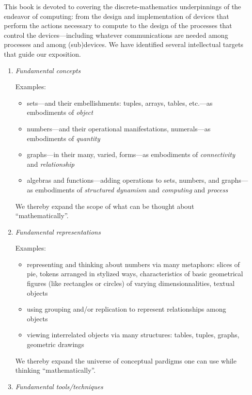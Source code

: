 This book is devoted to covering the discrete-mathematics
underpinnings of the endeavor of computing: from the design and
implementation of devices that perform the actions necessary to
compute to the design of the processes that control the
devices---including whatever communications are needed among processes
and among (sub)devices.  We have identified several intellectual
targets that guide our exposition.
\begin{enumerate}
\item
{\it Fundamental concepts}

\medskip

{\small\sf Examples:}
\begin{itemize}
\item%
sets---and their embellishments: tuples, arrays, tables, etc.---as
embodiments of {\it object}
\item
numbers---and their operational manifestations, numerals---as
embodiments of {\it quantity}
\item
graphs---in their many, varied, forms---as embodiments of {\it
  connectivity} and {\it relationship}
\item
algebras and functions---adding operations to sets, numbers, and
graphs---as embodiments of {\it structured dynamism} and {\it
  computing} and {\it process}
\end{itemize}
We thereby expand the scope of what can be thought about
``mathematically''.

\medskip

\item
{\it Fundamental representations}

\medskip

{\small\sf Examples:}
\begin{itemize}
\item
representing and thinking about numbers via many metaphors: slices of
pie, tokens arranged in stylized ways, characteristics of basic geometrical figures (like rectangles or circles)
of varying dimensionnalities, textual objects
\item
using grouping and/or replication to represent relationships among
objects
\item
viewing interrelated objects via many structures: tables, tuples,
graphs, geometric drawings
\end{itemize}
We thereby expand the universe of conceptual pardigms one can use
while thinking ``mathematically''.

\medskip

\item
{\it Fundamental tools/techniques}


\end{enumerate}
